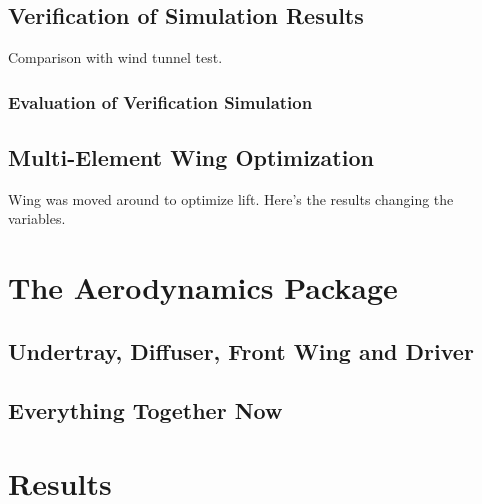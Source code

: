 \subsection{Verification of Simulation Results}

Comparison with wind tunnel test.

\subsubsection{Evaluation of Verification Simulation}

\subsection{Multi-Element Wing Optimization}
Wing was moved around to optimize lift. Here's the results changing the variables.
\section{The Aerodynamics Package}
\subsection{Undertray, Diffuser, Front Wing and Driver}
\subsection{Everything Together Now}
\section{Results}
